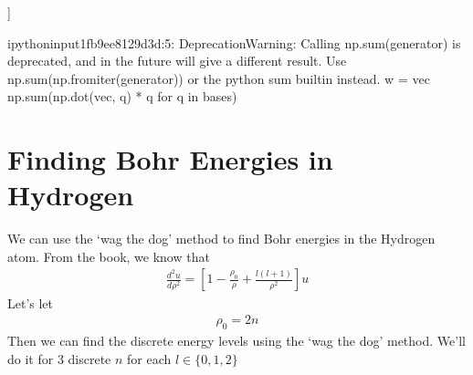 \documentclass[letterpaper,10pt,english]{jupyterBook}
\begin{document}
\begin{sphinxVerbatim}[commandchars=\\\{\}]
[[0.57735027+0.57735027j 0.        +0.57735027j 0.        +0.j        ]
 [0.0702873 \PYGZhy{}0.05857275j 0.15228915\PYGZhy{}0.01171455j 0.98402221+0.j        ]
 [0.31547059+0.83647199j 0.32032088+0.30859935j 0.03395199\PYGZhy{}0.04243999j]]
\end{sphinxVerbatim}

\begin{sphinxVerbatim}[commandchars=\\\{\}]
\PYGZlt{}ipython\PYGZhy{}input\PYGZhy{}1\PYGZhy{}fb9ee8129d3d\PYGZgt{}:5: DeprecationWarning: Calling np.sum(generator) is deprecated, and in the future will give a different result. Use np.sum(np.fromiter(generator)) or the python sum builtin instead.
  w = vec \PYGZhy{} np.sum(np.dot(vec, q) * q for q in bases)
\end{sphinxVerbatim}


\chapter{Finding Bohr Energies in Hydrogen}
\label{\detokenize{4.69:finding-bohr-energies-in-hydrogen}}\label{\detokenize{4.69::doc}}
\sphinxAtStartPar
We can use the ‘wag the dog’ method to find Bohr energies in the Hydrogen atom. From the book, we know that
\begin{equation*}
\begin{split}
\frac{d^2u}{d\rho^2} = \left[ 1-\frac{\rho_0}{\rho}+\frac{l(l+1)}{\rho^2} \right] u
\end{split}
\end{equation*}
\sphinxAtStartPar
Let’s let
\begin{equation*}
\begin{split}
\rho_0 = 2n
\end{split}
\end{equation*}
\sphinxAtStartPar
Then we can find the discrete energy levels using the ‘wag the dog’ method. We’ll do it for 3 discrete \(n\) for each \(l \in \{0,1,2\}\)
\end{document}
